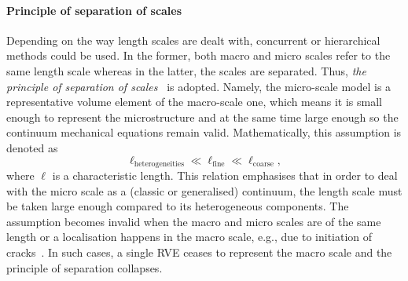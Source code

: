 	\paragraph{Principle of separation of scales} Depending on the way length scales are dealt with, concurrent or hierarchical methods could be used. In the former, both macro and micro scales refer to the same length scale whereas in the latter, the scales are separated. Thus, \textit{the principle of separation of scales}~\autocite{Geers.2010} is adopted. Namely, the micro-scale model is a representative volume element of the macro-scale one, which means it is small enough to represent the microstructure and at the same time large enough so the continuum mechanical equations remain valid. Mathematically, this assumption is denoted as
	\begin{equation}
		\ell_\text{heterogeneities} \ll \ell_\text{fine} \ll \ell_\text{coarse},
	\end{equation}
	where $\ell$ is a characteristic length. This relation emphasises that in order to deal with the micro scale as a (classic or generalised) continuum, the length scale must be taken large enough compared to its heterogeneous components. The assumption becomes invalid when the macro and micro scales are of the same length or a localisation happens in the macro scale, e.g., due to initiation of cracks~\autocite{Spahn.2015}. In such cases, a single RVE ceases to represent the macro scale and the principle of separation collapses.
	
